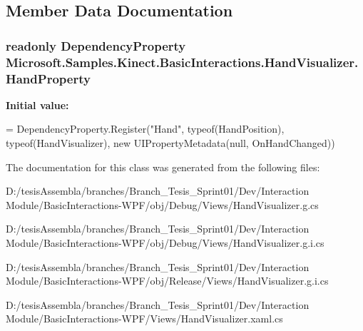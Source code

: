 \subsection{Member Data Documentation}
\hypertarget{class_microsoft_1_1_samples_1_1_kinect_1_1_basic_interactions_1_1_hand_visualizer_a5b354d0a42bd222ab5e3756a580d86c4}{
\subsubsection[{Hand\-Property}]{\setlength{\rightskip}{0pt plus 5cm}readonly Dependency\-Property Microsoft.\-Samples.\-Kinect.\-Basic\-Interactions.\-Hand\-Visualizer.\-Hand\-Property\hspace{0.3cm}{\ttfamily [static]}}}\label{class_microsoft_1_1_samples_1_1_kinect_1_1_basic_interactions_1_1_hand_visualizer_a5b354d0a42bd222ab5e3756a580d86c4}
{\bfseries Initial value\-:}
\begin{DoxyCode}
=
    DependencyProperty.Register(\textcolor{stringliteral}{"Hand"}, typeof(HandPosition), typeof(HandVisualizer), \textcolor{keyword}{new} 
      UIPropertyMetadata(null, OnHandChanged))
\end{DoxyCode}


The documentation for this class was generated from the following files\-:\begin{DoxyCompactItemize}
\item 
D\-:/tesis\-Assembla/branches/\-Branch\-\_\-\-Tesis\-\_\-\-Sprint01/\-Dev/\-Interaction Module/\-Basic\-Interactions-\/\-W\-P\-F/obj/\-Debug/\-Views/Hand\-Visualizer.\-g.\-cs\item 
D\-:/tesis\-Assembla/branches/\-Branch\-\_\-\-Tesis\-\_\-\-Sprint01/\-Dev/\-Interaction Module/\-Basic\-Interactions-\/\-W\-P\-F/obj/\-Debug/\-Views/Hand\-Visualizer.\-g.\-i.\-cs\item 
D\-:/tesis\-Assembla/branches/\-Branch\-\_\-\-Tesis\-\_\-\-Sprint01/\-Dev/\-Interaction Module/\-Basic\-Interactions-\/\-W\-P\-F/obj/\-Release/\-Views/Hand\-Visualizer.\-g.\-i.\-cs\item 
D\-:/tesis\-Assembla/branches/\-Branch\-\_\-\-Tesis\-\_\-\-Sprint01/\-Dev/\-Interaction Module/\-Basic\-Interactions-\/\-W\-P\-F/\-Views/Hand\-Visualizer.\-xaml.\-cs\end{DoxyCompactItemize}
